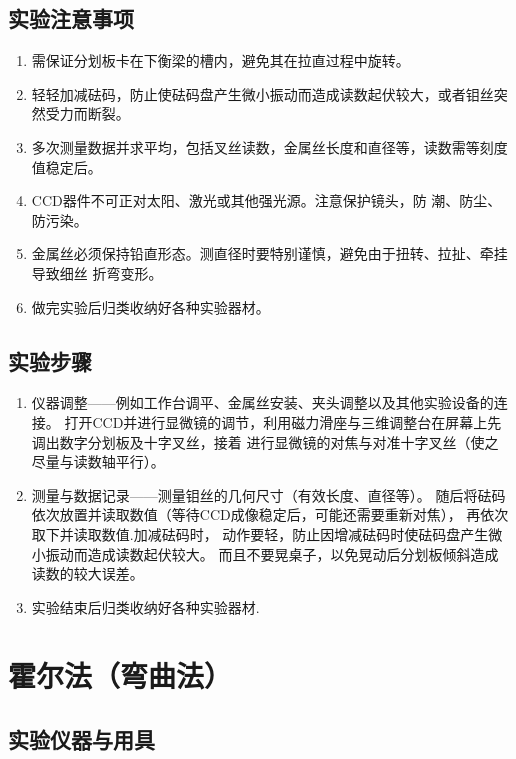 \documentclass[UTF8]{article}
\theoremstyle{MyLineTheoremStyle} %
\theoremstyle{MyBlockTheoremStyle} %
\theoremstyle{MySubsubsectionStyle} %
\begin{document}
\subsection{实验注意事项}
\begin{enumerate}
\item 需保证分划板卡在下衡梁的槽内，避免其在拉直过程中旋转。

\item 轻轻加减砝码，防止使砝码盘产生微小振动而造成读数起伏较大，或者钼丝突然受力而断裂。

\item 多次测量数据并求平均，包括叉丝读数，金属丝长度和直径等，读数需等刻度值稳定后。

\item CCD器件不可正对太阳、激光或其他强光源。注意保护镜头，防
潮、防尘、防污染。

\item 金属丝必须保持铅直形态。测直径时要特别谨慎，避免由于扭转、拉扯、牵挂导致细丝
折弯变形。

\item 做完实验后归类收纳好各种实验器材。
\end{enumerate}


\subsection{实验步骤}
\begin{enumerate}
\item 仪器调整——例如工作台调平、金属丝安装、夹头调整以及其他实验设备的连接。
打开CCD并进行显微镜的调节，利用磁力滑座与三维调整台在屏幕上先调出数字分划板及十字叉丝，接着
进行显微镜的对焦与对准十字叉丝（使之尽量与读数轴平行）。

\item 测量与数据记录——测量钼丝的几何尺寸（有效长度、直径等）。
随后将砝码依次放置并读取数值（等待CCD成像稳定后，可能还需要重新对焦），
再依次取下并读取数值.加减砝码时，
动作要轻，防止因增减砝码时使砝码盘产生微小振动而造成读数起伏较大。
而且不要晃桌子，以免晃动后分划板倾斜造成读数的较大误差。

\item 实验结束后归类收纳好各种实验器材.
\end{enumerate}


\section{霍尔法（弯曲法）}
\subsection{实验仪器与用具}
\end{document}
